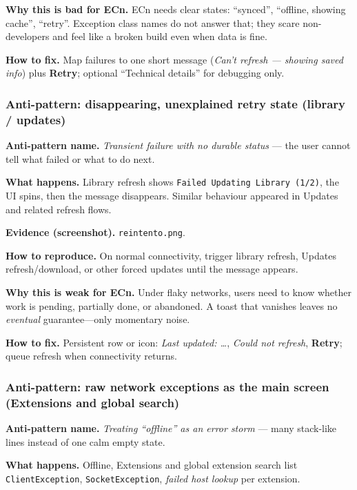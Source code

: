 \textbf{Why this is bad for ECn.} ECn needs clear states: ``synced'', ``offline, showing cache'', ``retry''. Exception class names do not answer that; they scare non-developers and feel like a broken build even when data is fine.

\textbf{How to fix.} Map failures to one short message (\emph{Can't refresh --- showing saved info}) plus \textbf{Retry}; optional ``Technical details'' for debugging only.

\subsubsection{Anti-pattern: disappearing, unexplained retry state (library / updates)}
\label{sec:ecn-ap-retry}
\textbf{Anti-pattern name.} \emph{Transient failure with no durable status} --- the user cannot tell what failed or what to do next.

\textbf{What happens.} Library refresh shows \texttt{Failed Updating Library (1/2)}, the UI spins, then the message disappears. Similar behaviour appeared in Updates and related refresh flows.

\textbf{Evidence (screenshot).} \texttt{reintento.png}.


\textbf{How to reproduce.} On normal connectivity, trigger library refresh, Updates refresh/download, or other forced updates until the message appears.

\textbf{Why this is weak for ECn.} Under flaky networks, users need to know whether work is pending, partially done, or abandoned. A toast that vanishes leaves no \emph{eventual} guarantee---only momentary noise.

\textbf{How to fix.} Persistent row or icon: \emph{Last updated: \ldots}, \emph{Could not refresh}, \textbf{Retry}; queue refresh when connectivity returns.

\subsubsection{Anti-pattern: raw network exceptions as the main screen (Extensions and global search)}
\label{sec:ecn-ap-extensions}
\textbf{Anti-pattern name.} \emph{Treating ``offline'' as an error storm} --- many stack-like lines instead of one calm empty state.

\textbf{What happens.} Offline, Extensions and global extension search list \texttt{ClientException}, \texttt{SocketException}, \emph{failed host lookup} per extension.

